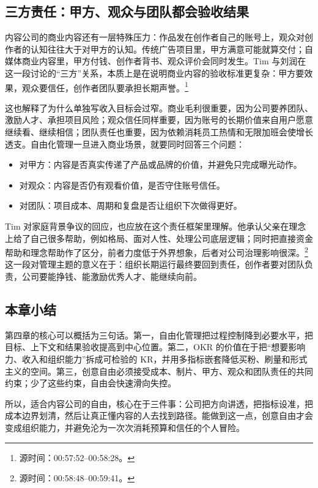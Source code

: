 \documentclass[a4paper]{article}
\begin{document}
\subsection{三方责任：甲方、观众与团队都会验收结果}

内容公司的商业内容还有一层特殊压力：作品发在创作者自己的账号上，观众对创作者的认知往往大于对甲方的认知。传统广告项目里，甲方满意可能就算交付；自媒体商业内容里，甲方付钱、创作者背书、观众评价会同时发生。Tim 与刘润在这一段讨论的“三方”关系，本质上是在说明商业内容的验收标准更复杂：甲方要效果，观众要信任，创作者团队要承担长期声誉。\footnote{源时间：00:57:52--00:58:28。}

这也解释了为什么单独写收入目标会过窄。商业毛利很重要，因为公司要养团队、激励人才、承担项目风险；观众信任同样重要，因为账号的长期价值来自用户愿意继续看、继续相信；团队责任也重要，因为依赖消耗员工热情和无限加班会使增长透支。自由化管理一旦进入商业场景，就要同时回答三个问题：

\begin{itemize}
  \item 对甲方：内容是否真实传递了产品或品牌的价值，并避免只完成曝光动作。
  \item 对观众：内容是否仍有观看价值，是否守住账号信任。
  \item 对团队：项目成本、周期和复盘是否让组织下次做得更好。
\end{itemize}

Tim 对家庭背景争议的回应，也应放在这个责任框架里理解。他承认父亲在理念上给了自己很多帮助，例如格局、面对人性、处理公司底层逻辑；同时把直接资金帮助和理念帮助作了区分，前者力度低于外界想象，后者对公司治理影响很深。\footnote{源时间：00:58:48--00:59:41。} 这一段对管理主题的意义在于：组织长期运行最终要回到责任，创作者要对团队负责，公司要能挣钱、能激励优秀人才、能继续向前。

\subsection{本章小结}

第四章的核心可以概括为三句话。第一，自由化管理把过程控制降到必要水平，把目标、上下文和结果验收提高到中心位置。第二，OKR 的价值在于把“想要影响力、收入和组织能力”拆成可检验的 KR，并用多指标嵌套降低买粉、刷量和形式主义的空间。第三，创意自由必须接受成本、制片、甲方、观众和团队责任的共同约束；少了这些约束，自由会快速滑向失控。

所以，适合内容公司的自由，核心在于三件事：公司把方向讲透，把指标设准，把成本边界划清，然后让真正懂内容的人去找到路径。能做到这一点，创意自由才会变成组织能力，并避免沦为一次次消耗预算和信任的个人冒险。
\end{document}
